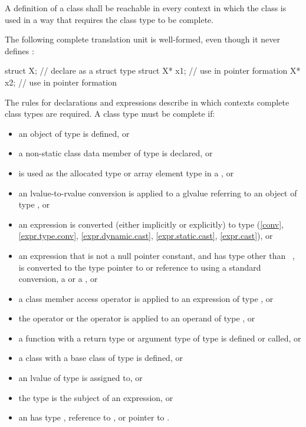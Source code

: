 \pnum
{}%
A definition of a class shall be reachable in every context in which
the class is used in a way that requires the class type to be complete.
\begin{example}
The following complete translation unit is well-formed,
even though it never defines :
\begin{codeblock}
struct X;                       // declare  as a struct type
struct X* x1;                   // use  in pointer formation
X* x2;                          // use  in pointer formation
\end{codeblock}
\end{example}
\begin{note}
The rules for declarations and expressions
describe in which contexts complete class types are required. A class
type  must be complete if:
\begin{itemize}
\item an object of type  is defined, or
\item a non-static class data member of type  is
declared, or
\item {} is used as the allocated type or array element type in a
, or
\item an lvalue-to-rvalue conversion is applied to
a glvalue referring
to an object of type , or
\item an expression is converted (either implicitly or explicitly) to
type  (\ref{conv}, \ref{expr.type.conv},
\ref{expr.dynamic.cast}, \ref{expr.static.cast}, \ref{expr.cast}), or
\item an expression that is not a null pointer constant, and has type
other than \cv{}~, is converted to the type pointer to 
or reference to  using a standard conversion,
a  or
a , or
\item a class member access operator is applied to an expression of type
, or
\item the  operator or the
 operator is applied to an operand of
type , or
\item a function with a return type or argument type of type 
is defined or called, or
\item a class with a base class of type  is
defined, or
\item an lvalue of type  is assigned to, or
\item the type  is the subject of an
 expression, or
\item an  has type , reference to
, or pointer to .
\end{itemize}
\end{note}

